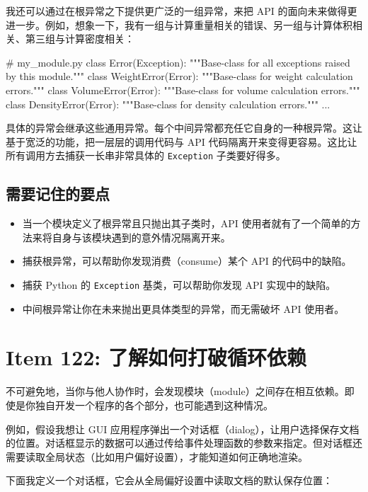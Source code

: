 我还可以通过在根异常之下提供更广泛的一组异常，来把 API 的面向未来做得更进一步。例如，想象一下，我有一组与计算重量相关的错误、另一组与计算体积相关、第三组与计算密度相关：

\begin{codebox}[python]
# my_module.py
class Error(Exception):
    """Base-class for all exceptions raised by this module."""
class WeightError(Error):
    """Base-class for weight calculation errors."""
class VolumeError(Error):
    """Base-class for volume calculation errors."""
class DensityError(Error):
    """Base-class for density calculation errors."""
...
\end{codebox}

具体的异常会继承这些通用异常。每个中间异常都充任它自身的一种根异常。这让基于宽泛的功能，把一层层的调用代码与 API 代码隔离开来变得更容易。这比让所有调用方去捕获一长串非常具体的 \texttt{Exception} 子类要好得多。

\subsection{需要记住的要点}

\begin{itemize}
\item 当一个模块定义了根异常且只抛出其子类时，API 使用者就有了一个简单的方法来将自身与该模块遇到的意外情况隔离开来。
\item 捕获根异常，可以帮助你发现消费（consume）某个 API 的代码中的缺陷。
\item 捕获 Python 的 \texttt{Exception} 基类，可以帮助你发现 API 实现中的缺陷。
\item 中间根异常让你在未来抛出更具体类型的异常，而无需破坏 API 使用者。
\end{itemize}

\section{Item 122: 了解如何打破循环依赖}

不可避免地，当你与他人协作时，会发现模块（module）之间存在相互依赖。即使是你独自开发一个程序的各个部分，也可能遇到这种情况。

例如，假设我想让 GUI 应用程序弹出一个对话框（dialog），让用户选择保存文档的位置。对话框显示的数据可以通过传给事件处理函数的参数来指定。但对话框还需要读取全局状态（比如用户偏好设置），才能知道如何正确地渲染。

下面我定义一个对话框，它会从全局偏好设置中读取文档的默认保存位置：

